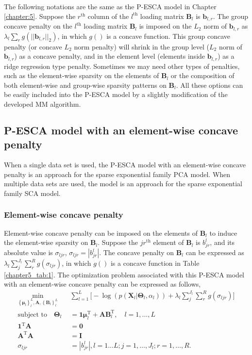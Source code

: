 The following notations are the same as the P-ESCA model in Chapter \ref{chapter:5}. Suppose the $r^{\text{th}}$ column of the $l^{\text{th}}$ loading matrix $\mathbf{B}_l$ is $\mathbf{b}_{l,r}$. The group concave penalty on the $l^{\text{th}}$ loading matrix $\mathbf{B}_l$ is imposed on the $L_2$ norm of $\mathbf{b}_{l,r}$ as $\lambda_l \sum_{r} g(||\mathbf{b}_{l,r}||_2)$, in which $g()$ is a concave function. This group concave penalty (or concave $L_2$ norm penalty) will shrink in the group level ($L_2$ norm of $\mathbf{b}_{l,r}$) as a concave penalty, and in the element level (elements inside $\mathbf{b}_{l,r}$) as a ridge regression type penalty. Sometimes we may need other types of penalties, such as the element-wise sparsity on the elements of $\mathbf{B}_l$ or the composition of both element-wise and group-wise sparsity patterns on $\mathbf{B}_l$. All these options can be easily included into the P-ESCA model by a slightly modification of the developed MM algorithm.

\subsection{P-ESCA model with an element-wise concave penalty}
When a single data set is used, the P-ESCA model with an element-wise concave penalty is an approach for the sparse exponential family PCA model. When multiple data sets are used, the model is an approach for the sparse exponential family SCA model.

\subsubsection{Element-wise concave penalty}
Element-wise concave penalty can be imposed on the elements of $\mathbf{B}_l$ to induce the element-wise sparsity on $\mathbf{B}_l$. Suppose the $jr^{\text{th}}$ element of $\mathbf{B}_l$ is $b_{jr}^{l}$, and its absolute value is $\sigma_{ljr}$, $\sigma_{ljr} = |b_{jr}^{l}|$. The concave penalty on $\mathbf{B}_l$ can be expressed as $\lambda_l \sum_{j}^{J_l}\sum_{r}^{R} g(\sigma_{ljr})$, in which $g()$ is a concave function in Table \ref{chapter5_tab:1}. The optimization problem associated with this P-ESCA model with an element-wise concave penalty can be expressed as follows,
\begin{equation}\label{chapter6_eq:1}
\begin{aligned}
    \min_{ \left\{\bm{\mu}_l\right\}_{l}^{L}, \mathbf{A}, \left\{\mathbf{B}_l\right\}_{l}^{L}} \quad & \sum_{l=1}^{L} \Big[ -\log(p(\mathbf{X}_l|\mathbf{\Theta}_l, \alpha_l)) + \lambda_l \sum_{j}^{J_l}\sum_{r}^{R} g(\sigma_{ljr}) \Big] \\
    \text{subject to} \quad \mathbf{\Theta}_l &= \mathbf{1}\bm{\mu}_l^{\text{T}} + \mathbf{AB}_l^{\text{T}}, \quad l = 1,\ldots,L \\
     \mathbf{1}^{\text{T}}\mathbf{A} &= \mathbf{0}\\
	 \mathbf{A}^{\text{T}}\mathbf{A} &= \mathbf{I} \\
	 \sigma_{ljr} &= |b_{jr}^{l}|, l = 1...L; j=1,\dots,J_l; r = 1,\ldots, R.
\end{aligned}
\end{equation}

